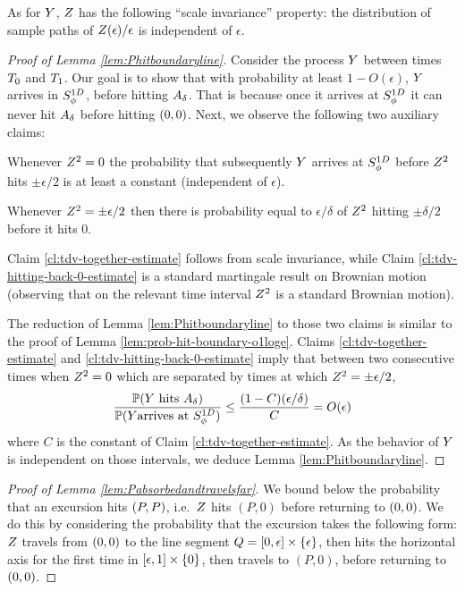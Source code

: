 {{As for $Y$, $Z$ has the following ``scale invariance''
property: the distribution of sample paths of $Z(\epsilon) /
\epsilon$ is independent of $\epsilon$.

\begin{proof}[Proof of Lemma \ref{lem:Phitboundaryline}]
Consider the process $Y$ between times $T_0$ and
$T_1$. Our goal is to show that with probability at least
$1-O(\epsilon)$, $Y$ arrives in $S^{1D}_{\phi}$, before hitting
$A_\delta$. That is because once it arrives at $S^{1D}_{\phi}$ it
can never hit $A_\delta$ before hitting $(0,0)$. Next, we observe the
following two auxiliary claims:

\begin{claim}\label{cl:tdv-together-estimate}
  Whenever $Z^2=0$ the probability that subsequently $Y$
  arrives at $S^{1D}_{\phi}$ before $Z^2$ hits $\pm\epsilon/2$ is at
  least a constant (independent of $\epsilon$).
\end{claim}

\begin{claim}\label{cl:tdv-hitting-back-0-estimate}
  Whenever $Z^2=\pm\epsilon/2$ then there is probability equal to
  $\epsilon/\delta$ of $Z^2$ hitting $\pm\delta/2$ before it hits $0$.
\end{claim}

Claim \ref{cl:tdv-together-estimate} follows from scale invariance, while
Claim \ref{cl:tdv-hitting-back-0-estimate} is a standard martingale result on
Brownian motion (observing that on the relevant time interval $Z^2$ is a
standard Brownian motion).

The reduction of Lemma \ref{lem:Phitboundaryline} to those two claims is
similar to the proof of Lemma \ref{lem:prob-hit-boundary-o1loge}. Claims
\ref{cl:tdv-together-estimate} and \ref{cl:tdv-hitting-back-0-estimate} imply
that between two consecutive times when $Z^2=0$ which are separated
by times at which $Z^2 = \pm\epsilon/2$,
\[
\frac{\mathbb{P}(Y\text{ hits }A_\delta)}{\mathbb{P}(Y\text{arrives at }S^{1D}_{\phi})}
\le \frac{(1-C)(\epsilon/\delta)}{C} =O(\epsilon)
\]
where $C$ is the constant of Claim \ref{cl:tdv-together-estimate}. As the
behavior of $Y$ is independent on those intervals, we deduce Lemma
\ref{lem:Phitboundaryline}.

\end{proof}
}
\begin{proof}[Proof of Lemma \ref{lem:Pabsorbedandtravelsfar}]
\newcommand{\rotfarpoint}{(P,0)}
\newcommand{\segment}{[\epsilon,1] \cross \{0\}}
We bound below the probability that an excursion hits $(P,P)$,
i.e.\ $Z$ hits $\rotfarpoint$ before returning to $(0,0)$.
We do this by considering the probability that the excursion takes
the following form: $Z$ travels from $(0,0)$ to the line
segment $Q = [0, \epsilon] \times \{\epsilon\}$, then hits the horizontal
axis for the first time in $\segment$, then travels to $\rotfarpoint$,
before returning to $(0,0)$.


\end{proof}}
